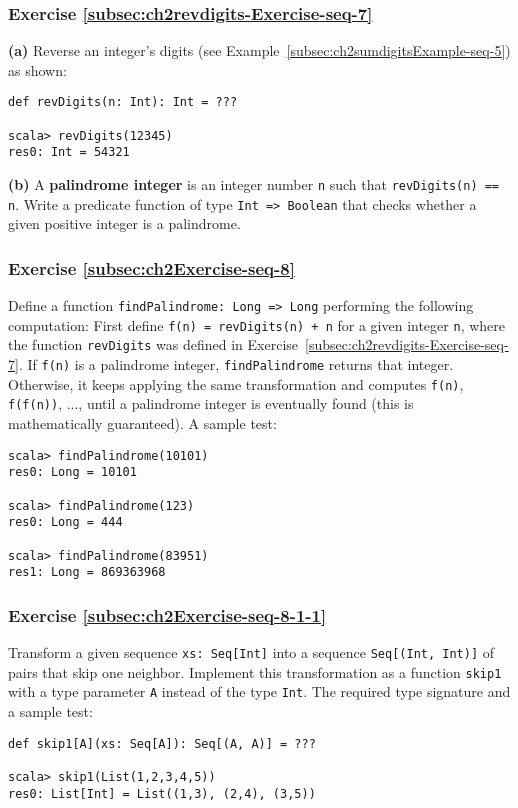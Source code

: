 \subsubsection{Exercise \label{subsec:ch2revdigits-Exercise-seq-7}\ref{subsec:ch2revdigits-Exercise-seq-7}}

\textbf{(a)} Reverse an integer\textsf{'}s digits (see Example~\ref{subsec:ch2sumdigitsExample-seq-5})
as shown:
\begin{lstlisting}
def revDigits(n: Int): Int = ???

scala> revDigits(12345)
res0: Int = 54321
\end{lstlisting}
\textbf{(b)} A \textbf{palindrome integer}
is an integer number \lstinline!n! such that \lstinline!revDigits(n) == n!.
Write a predicate function of type \lstinline!Int => Boolean! that
checks whether a given positive integer is a palindrome.

\subsubsection{Exercise \label{subsec:ch2Exercise-seq-8}\ref{subsec:ch2Exercise-seq-8}}

Define a function \lstinline!findPalindrome: Long => Long! performing
the following computation: First define \lstinline!f(n) = revDigits(n) + n!
for a given integer \lstinline!n!, where the function \lstinline!revDigits!
was defined in Exercise~\ref{subsec:ch2revdigits-Exercise-seq-7}.
If \lstinline!f(n)! is a palindrome integer, \lstinline!findPalindrome!
returns that integer. Otherwise, it keeps applying the same transformation
and computes \lstinline!f(n)!, \lstinline!f(f(n))!, ..., until a
palindrome integer is eventually found (this is mathematically guaranteed).
A sample test:
\begin{lstlisting}
scala> findPalindrome(10101)
res0: Long = 10101

scala> findPalindrome(123)
res0: Long = 444

scala> findPalindrome(83951)
res1: Long = 869363968
\end{lstlisting}


\subsubsection{Exercise \label{subsec:ch2Exercise-seq-8-1-1}\ref{subsec:ch2Exercise-seq-8-1-1}}

Transform a given sequence \lstinline!xs: Seq[Int]! into a sequence
\lstinline!Seq[(Int, Int)]! of pairs that skip one neighbor. Implement
this transformation as a function \lstinline!skip1! with a type parameter
\lstinline!A! instead of the type \lstinline!Int!. The required
type signature and a sample test:
\begin{lstlisting}
def skip1[A](xs: Seq[A]): Seq[(A, A)] = ???

scala> skip1(List(1,2,3,4,5))
res0: List[Int] = List((1,3), (2,4), (3,5))
\end{lstlisting}


